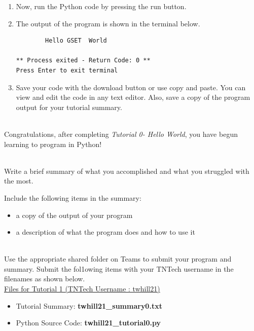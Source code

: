 \documentclass[12pt]{article}
\newcommand{\MNUM}{0} %
\begin{document}
\begin{description}[labelindent=1cm]
\begin{enumerate}
		\item Now, run the Python code by pressing the run button.
		
		\item	
		The output of the program is shown in the terminal below.
		\begin{lstlisting} 
		Hello GSET  World

** Process exited - Return Code: 0 **
Press Enter to exit terminal

		\end{lstlisting}
	
		\item Save your code with the download button or use copy and paste. You can view and edit the code in any text editor. Also, save a copy of the program output for your tutorial summary. 

	\end{enumerate}

\item[\textbf{\underline{Tutorial Complete:}}] \hfill \vspace{3mm}\\ 
	Congratulations, after completing {\it Tutorial \MNUM - Hello World}, you have begun learning to program in Python! \\


\newpage
\item[\textbf{\underline{Tutorial Summary:}}] \hfill \vspace{3mm}\\ 
Write a brief summary of what you accomplished and what you struggled with the most. 

Include the following items in the summary:
\begin{itemize}

\item a copy of the output of your program
\item a description of what the program does and how to use it

\end{itemize}


\item[\textbf{\underline{Submission on Teams:}}] \hfill \vspace{3mm}\\ 
Use the appropriate shared folder on Teams to submit your program and summary. Submit the fol1owing items with your TNTech username in the filenames as shown below. \vspace{0mm}\\

\underline{Files for Tutorial 1 (TNTech Username : twhill21)}

\begin{itemize}

\item Tutorial Summary: \textbf{ twhill21\_summary0.txt}

\item Python Source Code: \textbf{ twhill21\_tutorial0.py}

\end{itemize}


\end{description}
\end{document}
